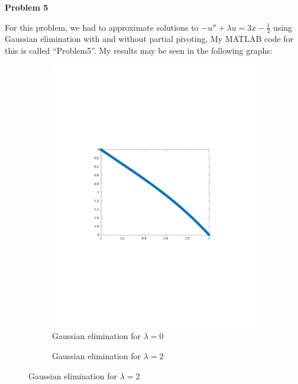 \documentclass{article}
\newcommand{\Problem}[1]{\textbf{Problem #1}}
\begin{document}
\Problem{5}

For this problem, we had to approximate solutions to $-u'' + \lambda u = 3x - \frac{1}{2}$ using Gaussian elimination with and without partial pivoting.
My MATLAB code for this is called ``Problem5''.
My results may be seen in the following graphs:
\begin{figure}[H]
\begin{subfigure}{0.48\textwidth}
\caption{Gaussian elimination for $\lambda = 0$}
\includegraphics[width=\linewidth]{gaussian_lambda_0_2}
\end{subfigure}\hspace*{\fill}
\begin{subfigure}{0.48\textwidth}
\caption{Gaussian elimination for $\lambda = 2$}

\end{subfigure}
\end{figure}
\end{document}
